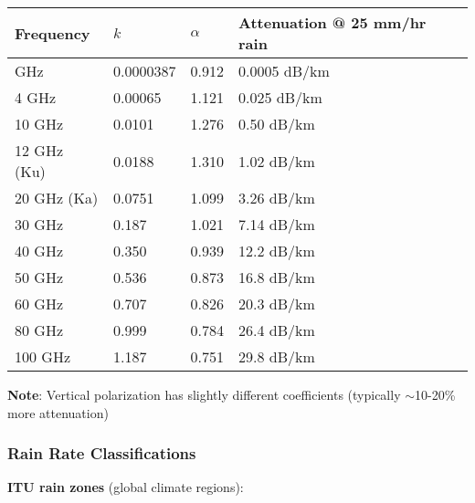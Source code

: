 {\def\LTcaptype{} %
\begin{longtable}[]{@{}llll@{}}
\toprule\noalign{}
Frequency & \(k\) & \(\alpha\) & Attenuation @ 25 mm/hr rain \\
\midrule\noalign{}
\endhead
\bottomrule\noalign{}
\endlastfoot
1 GHz & 0.0000387 & 0.912 & 0.0005 dB/km \\
4 GHz & 0.00065 & 1.121 & 0.025 dB/km \\
10 GHz & 0.0101 & 1.276 & 0.50 dB/km \\
12 GHz (Ku) & 0.0188 & 1.310 & 1.02 dB/km \\
20 GHz (Ka) & 0.0751 & 1.099 & 3.26 dB/km \\
30 GHz & 0.187 & 1.021 & 7.14 dB/km \\
40 GHz & 0.350 & 0.939 & 12.2 dB/km \\
50 GHz & 0.536 & 0.873 & 16.8 dB/km \\
60 GHz & 0.707 & 0.826 & 20.3 dB/km \\
80 GHz & 0.999 & 0.784 & 26.4 dB/km \\
100 GHz & 1.187 & 0.751 & 29.8 dB/km \\
\end{longtable}
}

\textbf{Note}: Vertical polarization has slightly different coefficients
(typically $\sim$10-20\% more attenuation)



\subsubsection{Rain Rate Classifications}

\textbf{ITU rain zones} (global climate regions):


